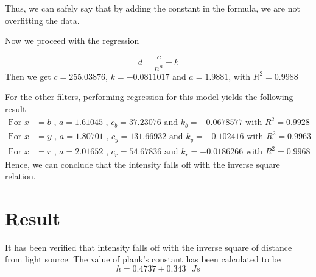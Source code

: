 \documentclass[12pt]{article}
\newlength\fwidth
\newlength\fheight
\begin{document}
Thus, we can safely say that by adding the constant in the formula, we are not overfitting the data.

Now we proceed with the regression
\begin{figure}[!ht]
    \centering
    \setlength{}
    \setlength{}
    
\end{figure}
$$\displaystyle d = \frac{c}{n^a}+k$$
Then we get $c=255.03876$, $k=-0.0811017$ and $a=1.9881$, with $R^{2}=0.9988$

\noindent For the other filters, performing regression for this model yields the following result
\begin{align*}
    \text{For } x&=b \text{ , } a=1.61045\text{ , } c_b=37.23076 \text{ and } k_b=-0.0678577 \text{ with } R^{2}=0.9928 \\
    \text{For } x&=y \text{ , } a=1.80701\text{ , } c_y=131.66932 \text{ and } k_y=-0.102416 \text{ with } R^{2}=0.9963 \\
    \text{For } x&=r \text{ , } a=2.01652\text{ , } c_r=54.67836 \text{ and } k_r=-0.0186266 \text{ with } R^{2}=0.9968
\end{align*}
Hence, we can conclude that the intensity falls off with the inverse square relation.

\section*{Result}
It has been verified that intensity falls off with the inverse square of distance from light source.
The value of plank's constant has been calculated to be
\[h = 0.4737 \pm 0.343\text{ }Js\]
\end{document}
